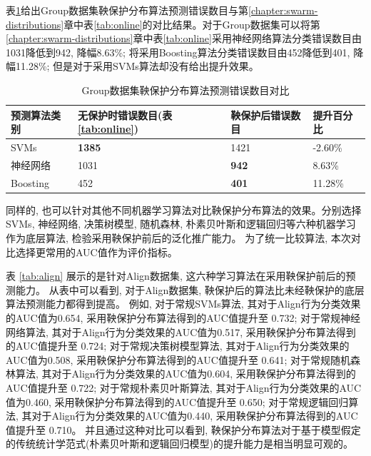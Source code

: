 表\ref{tab:group-num-martingale}给出Group数据集鞅保护分布算法预测错误数目与第\ref{chapter:swarm-distributions}章中表\ref{tab:online}的对比结果。对于Group数据集可以将第\ref{chapter:swarm-distributions}章中表\ref{tab:online}采用神经网络算法分类错误数目由1031降低到942, 降幅8.63\%; 将采用Boosting算法分类错误数目由452降低到401, 降幅11.28\%; 但是对于采用SVMs算法却没有给出提升效果。

\begin{table}[]
\centering
\caption{Group数据集鞅保护分布算法预测错误数目对比}
\label{tab:group-num-martingale}
\begin{tabular}{@{}llll@{}}
\toprule
预测算法类别   & 无保护时错误数目(表\ref{tab:online}) & 鞅保护后错误数目 & 提升百分比 \\ \midrule
SVMs     & \textbf{1385}          & 1421      &      {-2.60\%} \\
神经网络     & 1031           & \textbf{942}      &   {8.63\%}   \\
Boosting & 452          & \textbf{401}     &      {11.28\%} \\ \bottomrule
\end{tabular}%
\end{table}


同样的, 也可以针对其他不同机器学习算法对比鞅保护分布算法的效果。分别选择 SVMs, 神经网络, 决策树模型, 随机森林, 朴素贝叶斯和逻辑回归等六种机器学习作为底层算法, 检验采用鞅保护前后的泛化推广能力。 为了统一比较算法, 本次对比选择更常用的AUC值作为评价指标。

表 \ref{tab:align} 展示的是针对Align数据集, 这六种学习算法在采用鞅保护前后的预测能力。 从表中可以看到, 对于Align数据集, 鞅保护后的算法比未经鞅保护的底层算法预测能力都得到提高。 例如, 对于常规SVMs算法, 其对于Align行为分类效果的AUC值为0.654, 采用鞅保护分布算法得到的AUC值提升至 0.732; 对于常规神经网络算法, 其对于Align行为分类效果的AUC值为0.517, 采用鞅保护分布算法得到的AUC值提升至 0.724; 对于常规决策树模型算法, 其对于Align行为分类效果的AUC值为0.508, 采用鞅保护分布算法得到的AUC值提升至 0.641; 对于常规随机森林算法, 其对于Align行为分类效果的AUC值为0.604, 采用鞅保护分布算法得到的AUC值提升至 0.722; 对于常规朴素贝叶斯算法, 其对于Align行为分类效果的AUC值为0.460, 采用鞅保护分布算法得到的AUC值提升至 0.650; 对于常规逻辑回归算法, 其对于Align行为分类效果的AUC值为0.440, 采用鞅保护分布算法得到的AUC值提升至 0.710。 并且通过这种对比可以看到, 鞅保护分布算法对于基于模型假定的传统统计学范式(朴素贝叶斯和逻辑回归模型)的提升能力是相当明显可观的。 

